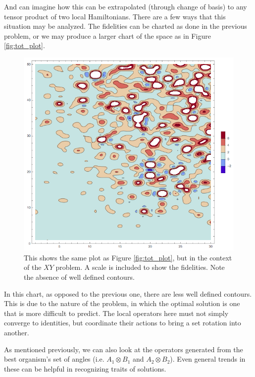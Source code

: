 \documentclass[11pt,twocolumn]{article}
\begin{document}
	And can imagine how this can be extrapolated (through change of basis) to any tensor product of two local Hamiltonians. There are a few ways that this situation may be analyzed. The fidelities can be charted as done in the previous problem, or we may produce a larger chart of the space as in Figure \ref{fig:tot_plot}. 

	\begin{figure}[htpb]
		\centering
			\includegraphics[scale=0.3]{xyPlot_50O_20G.png}
		\centering
		\caption{This shows the same plot as Figure \ref{fig:tot_plot}, but in the context of the $XY$ problem. A scale is included to show the fidelities. Note the absence of well defined contours.}
		\label{fig:xy_plot}
	\end{figure}

	In this chart, as opposed to the previous one, there are less well defined contours. This is due to the nature of the problem, in which the optimal solution is one that is more difficult to predict. The local operators here must not simply converge to identities, but coordinate their actions to bring a set rotation into another.
    
    As mentioned previously, we can also look at the operators generated from the best organism's set of angles (i.e. $A_1 \otimes B_1$ and $A_2 \otimes B_2$). Even general trends in these can be helpful in recognizing traits of solutions.
\end{document}
